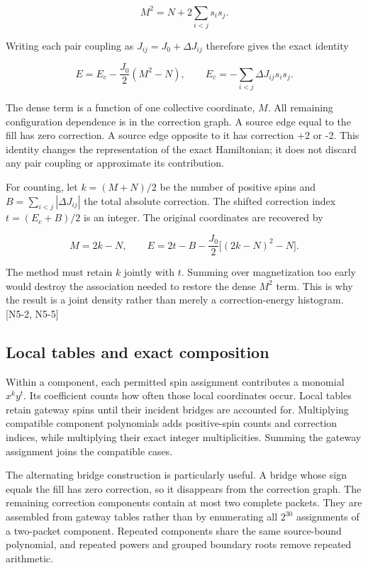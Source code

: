 \[M^2=N+2\sum_{i<j}s_i s_j.\]

Writing each pair coupling as \(J_{ij}=J_0+\Delta J_{ij}\) therefore gives the exact identity

\[E=E_c-\frac{J_0}{2}(M^2-N),\qquad E_c=-\sum_{i<j}\Delta J_{ij}s_i s_j.\]

The dense term is a function of one collective coordinate, \(M\). All remaining configuration dependence is in the correction graph. A source edge equal to the fill has zero correction. A source edge opposite to it has correction +2 or -2. This identity changes the representation of the exact Hamiltonian; it does not discard any pair coupling or approximate its contribution.

For counting, let \(k=(M+N)/2\) be the number of positive spins and \(B=\sum_{i<j}|\Delta J_{ij}|\) the total absolute correction. The shifted correction index \(t=(E_c+B)/2\) is an integer. The original coordinates are recovered by

\[M=2k-N,\qquad E=2t-B-\frac{J_0}{2}\bigl[(2k-N)^2-N\bigr].\]

The method must retain \(k\) jointly with \(t\). Summing over magnetization too early would destroy the association needed to restore the dense \(M^2\) term. This is why the result is a joint density rather than merely a correction-energy histogram. {[}N5-2, N5-5{]}

\subsection{Local tables and exact composition}\label{local-tables-and-exact-composition}

Within a component, each permitted spin assignment contributes a monomial \(x^k y^t\). Its coefficient counts how often those local coordinates occur. Local tables retain gateway spins until their incident bridges are accounted for. Multiplying compatible component polynomials adds positive-spin counts and correction indices, while multiplying their exact integer multiplicities. Summing the gateway assignment joins the compatible cases.

The alternating bridge construction is particularly useful. A bridge whose sign equals the fill has zero correction, so it disappears from the correction graph. The remaining correction components contain at most two complete packets. They are assembled from gateway tables rather than by enumerating all \(2^{30}\) assignments of a two-packet component. Repeated components share the same source-bound polynomial, and repeated powers and grouped boundary roots remove repeated arithmetic.


